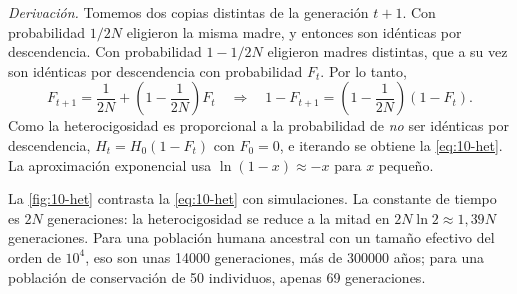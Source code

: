 \emph{Derivación.} Tomemos dos copias distintas de la generación $t+1$. Con probabilidad $1/2N$ eligieron la misma madre, y entonces son idénticas por descendencia. Con probabilidad $1-1/2N$ eligieron madres distintas, que a su vez son idénticas por descendencia con probabilidad $F_t$. Por lo tanto,
\begin{equation}\label{eq:10-ibd}
F_{t+1} = \frac{1}{2N} + \left(1-\frac{1}{2N}\right)F_t
\quad\Longrightarrow\quad
1-F_{t+1} = \left(1-\frac{1}{2N}\right)(1-F_t).
\end{equation}
Como la heterocigosidad es proporcional a la probabilidad de \emph{no} ser idénticas por descendencia, $H_t=H_0(1-F_t)$ con $F_0=0$, e iterando se obtiene la \cref{eq:10-het}. La aproximación exponencial usa $\ln(1-x)\approx -x$ para $x$ pequeño.

\begin{simbolos}
\end{simbolos}

La \cref{fig:10-het} contrasta la \cref{eq:10-het} con simulaciones. La constante de tiempo es $2N$ generaciones: la heterocigosidad se reduce a la mitad en $2N\ln 2\approx 1{,}39N$ generaciones. Para una población humana ancestral con un tamaño efectivo del orden de $10^4$, eso son unas \num{14000} generaciones, más de \num{300000} años; para una población de conservación de 50 individuos, apenas 69 generaciones.

